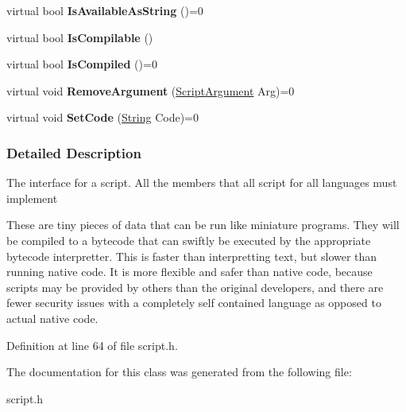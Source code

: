 \begin{DoxyCompactItemize}
\item 
\hypertarget{classMezzanine_1_1Scripting_1_1Script_af7351a14b9f1e56dde085f53723d3b5d}{
virtual bool {\bfseries IsAvailableAsString} ()=0}
\label{classMezzanine_1_1Scripting_1_1Script_af7351a14b9f1e56dde085f53723d3b5d}

\item 
\hypertarget{classMezzanine_1_1Scripting_1_1Script_a33426cd4b08b4078fda249a00c821005}{
virtual bool {\bfseries IsCompilable} ()}
\label{classMezzanine_1_1Scripting_1_1Script_a33426cd4b08b4078fda249a00c821005}

\item 
\hypertarget{classMezzanine_1_1Scripting_1_1Script_ac920f191e8df2814427341e59c423aa6}{
virtual bool {\bfseries IsCompiled} ()=0}
\label{classMezzanine_1_1Scripting_1_1Script_ac920f191e8df2814427341e59c423aa6}

\item 
\hypertarget{classMezzanine_1_1Scripting_1_1Script_ac230f00328239b54b9f62a3dfcea9a7f}{
virtual void {\bfseries RemoveArgument} (\hyperlink{classMezzanine_1_1Scripting_1_1ScriptArgument}{ScriptArgument} Arg)=0}
\label{classMezzanine_1_1Scripting_1_1Script_ac230f00328239b54b9f62a3dfcea9a7f}

\item 
\hypertarget{classMezzanine_1_1Scripting_1_1Script_aae36c7fa4c78d5aac838bfca7c112ce2}{
virtual void {\bfseries SetCode} (\hyperlink{namespaceMezzanine_acf9fcc130e6ebf08e3d8491aebcf1c86}{String} Code)=0}
\label{classMezzanine_1_1Scripting_1_1Script_aae36c7fa4c78d5aac838bfca7c112ce2}

\end{DoxyCompactItemize}


\subsubsection{Detailed Description}
The interface for a script. All the members that all script for all languages must implement \par
 \par
 These are tiny pieces of data that can be run like miniature programs. They will be compiled to a bytecode that can swiftly be executed by the appropriate bytecode interpretter. This is faster than interpretting text, but slower than running native code. It is more flexible and safer than native code, because scripts may be provided by others than the original developers, and there are fewer security issues with a completely self contained language as opposed to actual native code. 

Definition at line 64 of file script.h.



The documentation for this class was generated from the following file:\begin{DoxyCompactItemize}
\item 
script.h\end{DoxyCompactItemize}
